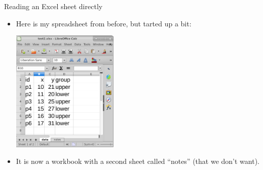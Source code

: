 \documentclass[unknownkeysallowed]{beamer}\usepackage[]{graphicx}\usepackage[]{color}
\begin{document}
\begin{frame}[fragile]{Reading an Excel sheet directly}
  
  \begin{itemize}
  \item Here is my spreadsheet from before, but tarted up a bit:

    \begin{center}
\includegraphics[width=0.4\textwidth]{excel}      
    \end{center}
    
\item It is now a workbook with a second sheet called ``notes'' (that
  we don't want).
  \end{itemize}
  
\end{frame}

\end{document}
